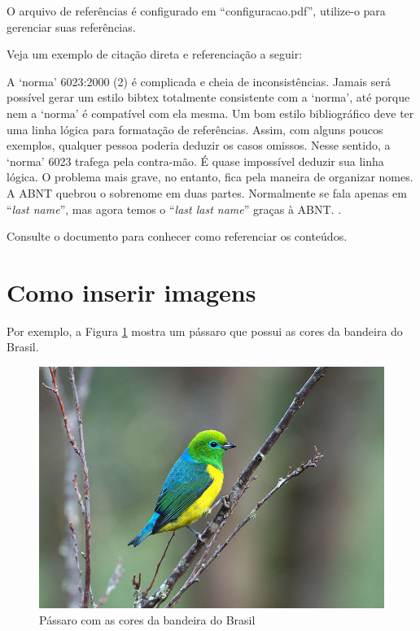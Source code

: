 \documentclass[
	12pt,				%
	oneside,			%
	a4paper,			%
	english,			%
	french,				%
	spanish,			%
	brazil				%
	]{abntex2}
\renewenvironment{quote}
  {\small\list{}{\rightmargin=0.1cm \leftmargin=4cm}%
   \item\relax}
  {\endlist}
\begin{document}
O arquivo de referências é configurado em ``configuracao.pdf'',
utilize-o para gerenciar suas referências.

Veja um exemplo de citação direta e referenciação a seguir:

\begin{quote}
A `norma' 6023:2000 (2) é complicada e cheia de inconsistências. Jamais
será possível gerar um estilo bibtex totalmente consistente com a
`norma', até porque nem a `norma' é compatível com ela mesma. Um bom
estilo bibliográfico deve ter uma linha lógica para formatação de
referências. Assim, com alguns poucos exemplos, qualquer pessoa poderia
deduzir os casos omissos. Nesse sentido, a `norma' 6023 trafega pela
contra-mão. É quase impossível deduzir sua linha lógica. O problema mais
grave, no entanto, fica pela maneira de organizar nomes. A ABNT quebrou
o sobrenome em duas partes. Normalmente se fala apenas em ``\emph{last
name}'', mas agora temos o ``\emph{last last name}'' graças à ABNT.
\cite[p. 5]{abntex2cite}.
\end{quote}

Consulte o documento  para conhecer como
referenciar os conteúdos.

\hypertarget{como-inserir-imagens}{%
\section{Como inserir imagens}\label{como-inserir-imagens}}

Por exemplo, a Figura \ref{passaro} mostra um pássaro que possui as
cores da bandeira do Brasil.

\begin{figure}[htbp]
\hypertarget{passaro}{%
\caption{Pássaro com as cores da bandeira do Brasil}\label{passaro}
\begin{center}
\includegraphics[scale=0.4]{imagens/passaro.jpg}
\end{center}
}
\end{figure}
\end{document}
